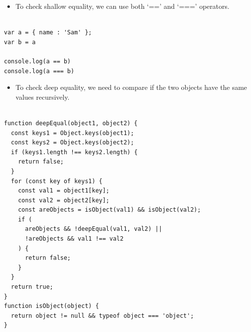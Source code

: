 \begin{frame}[fragile]{}

\begin{itemize}
	\item To check shallow equality, we can use both `==' and `===' operators.
\end{itemize}

\begin{Code}{}%
\begin{lstlisting}[firstnumber=1, label=glabels, xleftmargin=0pt, basicstyle=\scriptsize]% 

var a = { name : 'Sam' };
var b = a

console.log(a == b)
console.log(a === b)
\end{lstlisting}%
\end{Code}%
\end{frame}

\begin{frame}[fragile]{}

\begin{itemize}
	\item To check deep equality, we need to compare if the two objects have the same values recursively. 
\end{itemize}

\begin{Code}{}%
\begin{lstlisting}[firstnumber=1, label=glabels, xleftmargin=0pt, basicstyle=\tiny]% 

function deepEqual(object1, object2) {
  const keys1 = Object.keys(object1);
  const keys2 = Object.keys(object2);
  if (keys1.length !== keys2.length) {
    return false;
  }
  for (const key of keys1) {
    const val1 = object1[key];
    const val2 = object2[key];
    const areObjects = isObject(val1) && isObject(val2);
    if (
      areObjects && !deepEqual(val1, val2) ||
      !areObjects && val1 !== val2
    ) {
      return false;
    }
  }
  return true;
}
function isObject(object) {
  return object != null && typeof object === 'object';
}
\end{lstlisting}%
\end{Code}%

\end{frame}


